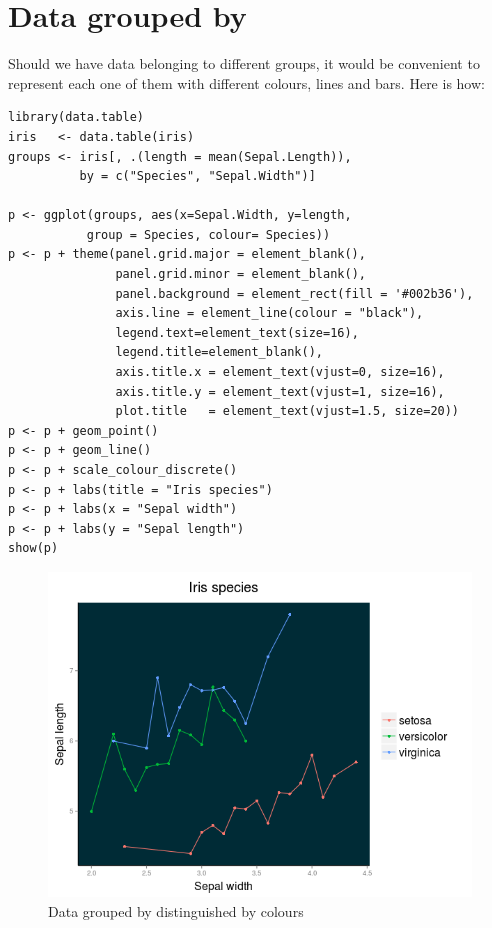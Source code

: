 \section{Data grouped by}
Should we have data belonging to different 
groups, it would be convenient to represent
each one of them with different colours, lines
and bars. Here is how:
\begin{verbatim}
library(data.table)
iris   <- data.table(iris)
groups <- iris[, .(length = mean(Sepal.Length)), 
	      by = c("Species", "Sepal.Width")]

p <- ggplot(groups, aes(x=Sepal.Width, y=length, 
		   group = Species, colour= Species))
p <- p + theme(panel.grid.major = element_blank(), 
               panel.grid.minor = element_blank(),
               panel.background = element_rect(fill = '#002b36'),
               axis.line = element_line(colour = "black"),
               legend.text=element_text(size=16),
               legend.title=element_blank(),
               axis.title.x = element_text(vjust=0, size=16),
               axis.title.y = element_text(vjust=1, size=16),
               plot.title   = element_text(vjust=1.5, size=20)) 
p <- p + geom_point()
p <- p + geom_line() 
p <- p + scale_colour_discrete()
p <- p + labs(title = "Iris species")
p <- p + labs(x = "Sepal width")
p <- p + labs(y = "Sepal length")
show(p)      
\end{verbatim}
\begin{figure}[htbp]
 \centering
 \includegraphics[scale = .65]{images/grouped_colours}
 \caption*{Data grouped by distinguished by colours}
\end{figure}

